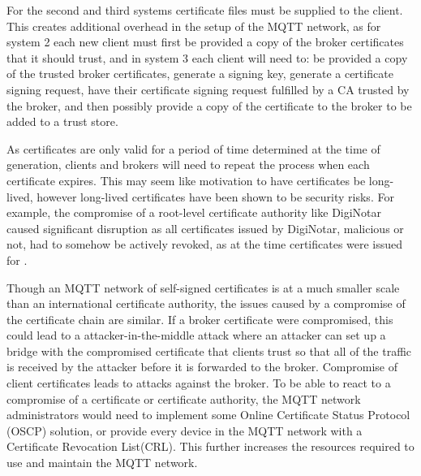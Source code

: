 \documentclass[12pt]{article}
\begin{document}
For the second and third systems certificate files must be supplied to the client. This creates additional overhead in the setup of the MQTT network, as for system 2 each new client must first be provided a copy of the broker certificates that it should trust, and in system 3 each client will need to: be provided a copy of the trusted broker certificates, generate a signing key, generate a certificate signing request, have their certificate signing request fulfilled by a CA trusted by the broker, and then possibly provide a copy of the certificate to the broker to be added to a trust store.\par
As certificates are only valid for a period of time determined at the time of generation, clients and brokers will need to repeat the process when each certificate expires. This may seem like motivation to have certificates be long-lived, however long-lived certificates have been shown to be security risks. For example, the compromise of a root-level certificate authority like DigiNotar caused significant disruption as all certificates issued by DigiNotar, malicious or not, had to somehow be actively revoked, as at the time certificates were issued for \cite{diginotar}.\par
Though an MQTT network of self-signed certificates is at a much smaller scale than an international certificate authority, the issues caused by a compromise of the certificate chain are similar. If a broker certificate were compromised, this could lead to a attacker-in-the-middle attack where an attacker can set up a bridge with the compromised certificate that clients trust so that all of the traffic is received by the attacker before it is forwarded to the broker. Compromise of client certificates leads to attacks against the broker. To be able to react to a compromise of a certificate or certificate authority, the MQTT network administrators would need to implement some Online Certificate Status Protocol (OSCP) solution, or provide every device in the MQTT network with a Certificate Revocation List(CRL). This further increases the resources required to use and maintain the MQTT network. 
\end{document}

